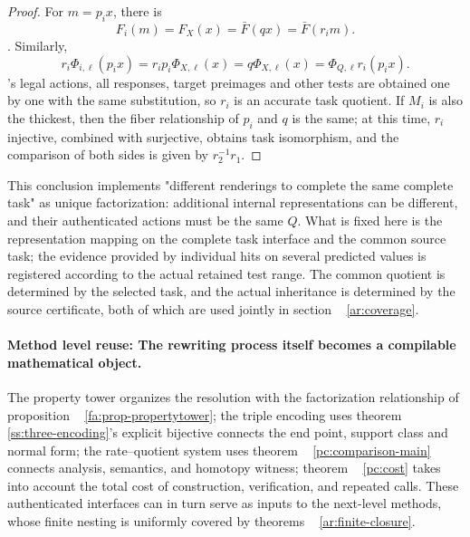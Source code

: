\documentclass[11pt,a4paper]{article}
\theoremstyle{plain}
\theoremstyle{definition}
\theoremstyle{remark}
\begin{document}
\begin{CJK*}
\begin{proof}
For $m=p_i x$, there is \[
 F_i(m)=F_X(x)=\bar F(qx)=\bar F(r_i m).
\]. Similarly, \[
 r_i\Phi_{i,\ell}(p_i x)
 =r_i p_i\Phi_{X,\ell}(x)
 =q\Phi_{X,\ell}(x)
 =\Phi_{Q,\ell}r_i(p_i x).
\]'s legal actions, all responses, target preimages and other tests are obtained one by one with the same substitution, so $r_i$ is an accurate task quotient. If $M_i$ is also the thickest, then the fiber relationship of $p_i$ and $q$ is the same; at this time, $r_i$ injective, combined with surjective, obtains task isomorphism, and the comparison of both sides is given by $r_2^{-1}r_1$.\end{proof}


This conclusion implements "different renderings to complete the same complete task" as unique factorization: additional internal representations can be different, and their authenticated actions must be the same $Q$. What is fixed here is the representation mapping on the complete task interface and the common source task; the evidence provided by individual hits on several predicted values is registered according to the actual retained test range. The common quotient is determined by the selected task, and the actual inheritance is determined by the source certificate, both of which are used jointly in section ~ \ref{ar:coverage}.

\paragraph { Method level reuse: The rewriting process itself becomes a compilable mathematical object. } The property tower organizes the resolution with the factorization relationship of proposition ~ \ref{fa:prop-propertytower}; the triple encoding uses theorem ~ \ref{ss:three-encoding}'s explicit bijective connects the end point, support class and normal form; the rate--quotient system uses theorem ~ \ref{pc:comparison-main} connects analysis, semantics, and homotopy witness; theorem ~ \ref{pc:cost} takes into account the total cost of construction, verification, and repeated calls. These authenticated interfaces can in turn serve as inputs to the next-level methods, whose finite nesting is uniformly covered by theorems ~ \ref{ar:finite-closure}.


\end{CJK*}
\end{document}

